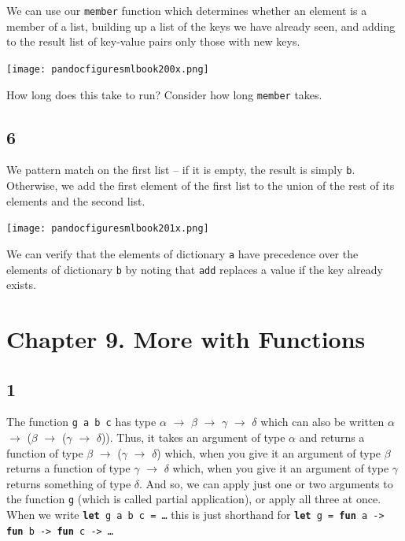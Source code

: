 \documentclass[]{book}
\begin{document}
We can use our \texttt{member} function which determines whether an element is a member of a list, building up a list of the keys we have already seen, and adding to the result list of key-value pairs only those with new keys.

\medskip
\begin{center}
\noindent\texttt{[image: pandocfiguresmlbook200x.png]}
\end{center}
\medskip

\noindent How long does this take to run? Consider how long \texttt{member} takes.

\subsection*{6}
We pattern match on the first list -- if it is empty, the result is simply \texttt{b}. Otherwise, we add the first element of the first list to the union of the rest of its elements and the second list.

\medskip
\begin{center}
\noindent\texttt{[image: pandocfiguresmlbook201x.png]}
\end{center}
\medskip

\noindent We can verify that the elements of dictionary \texttt{a} have precedence over the elements of dictionary \texttt{b} by noting that \texttt{add} replaces a value if the key already exists.

\section*{Chapter 9. More with Functions}

\subsection*{1}

The function \texttt{g a b c} has type $\alpha$ $\rightarrow$ $\beta$ $\rightarrow$ $\gamma$ $\rightarrow$  $\delta$ which can also be written $\alpha$ $\rightarrow$ \textmd{(}$\beta$ $\rightarrow$ \textmd{(}$\gamma$ $\rightarrow$ $\delta$\textmd{))}. Thus, it takes an argument of type $\alpha$ and returns a function of type $\beta$ $\rightarrow$ \textmd{(}$\gamma$ $\rightarrow$ $\delta$\textmd{)} which, when you give it an argument of type $\beta$ returns a function of type $\gamma$ $\rightarrow$ $\delta$ which, when you give it an argument of type $\gamma$ returns something of type $\delta$. And so, we can apply just one or two arguments to the function \texttt{g} (which is called partial application), or apply all three at once. When we write \textbf{\texttt{let}}\texttt{ g a b c = \ldots} this is just shorthand for \textbf{\texttt{let}}\texttt{ g = }\textbf{\texttt{fun}}\texttt{ a -> }\textbf{\texttt{fun}}\texttt{ b -> }\textbf{\texttt{fun}}\texttt{ c -> \ldots}
\end{document}
